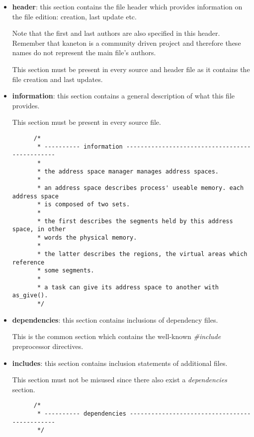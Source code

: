 \begin{itemize}
  \item
    \textbf{header}: this section contains the file header which provides
    information on the file edition: creation, last update etc.

    \-

    Note that the first and last authors are also specified in this header.
    Remember that kaneton is a community driven project and therefore these
    names do not represent the main file's authors.

    \-

    This section must be present in every source and header file as it
    contains the file creation and last updates.
  \item
    \textbf{information}: this section contains a general description of
    what this file provides.

    \-

    This section must be present in every source file.

    \begin{verbatim}
      /*
       * ---------- information -----------------------------------------------
       *
       * the address space manager manages address spaces.
       *
       * an address space describes process' useable memory. each address space
       * is composed of two sets.
       *
       * the first describes the segments held by this address space, in other
       * words the physical memory.
       *
       * the latter describes the regions, the virtual areas which reference
       * some segments.
       *
       * a task can give its address space to another with as_give().
       */
    \end{verbatim}
  \item
    \textbf{dependencies}: this section contains inclusions of dependency
    files.

    \-

    This is the common section which contains the well-known \textit{\#include}
    preprocessor directives.
  \item
    \textbf{includes}: this section contains inclusion statements of additional
    files.

    \-

    This section must not be misused since there also exist a
    \textit{dependencies} section.

    \begin{verbatim}
      /*
       * ---------- dependencies ----------------------------------------------
       */


\end{verbatim}
\end{itemize}
